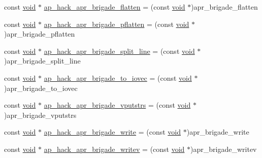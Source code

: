 \begin{DoxyCompactItemize}
\item 
const \hyperlink{group__MOD__ISAPI_gacd6cdbf73df3d9eed42fa493d9b621a6}{void} $\ast$ \hyperlink{srclib_2apr-util_2exports_8c_a2eaa178569772a75cf74731400d923e2}{ap\+\_\+hack\+\_\+apr\+\_\+brigade\+\_\+flatten} = (const \hyperlink{group__MOD__ISAPI_gacd6cdbf73df3d9eed42fa493d9b621a6}{void} $\ast$)apr\+\_\+brigade\+\_\+flatten
\item 
const \hyperlink{group__MOD__ISAPI_gacd6cdbf73df3d9eed42fa493d9b621a6}{void} $\ast$ \hyperlink{srclib_2apr-util_2exports_8c_a321cdc810a9ef25e33c780c78d5c69af}{ap\+\_\+hack\+\_\+apr\+\_\+brigade\+\_\+pflatten} = (const \hyperlink{group__MOD__ISAPI_gacd6cdbf73df3d9eed42fa493d9b621a6}{void} $\ast$)apr\+\_\+brigade\+\_\+pflatten
\item 
const \hyperlink{group__MOD__ISAPI_gacd6cdbf73df3d9eed42fa493d9b621a6}{void} $\ast$ \hyperlink{srclib_2apr-util_2exports_8c_aa39ddeace2f4d1eb0b699d29a896a1be}{ap\+\_\+hack\+\_\+apr\+\_\+brigade\+\_\+split\+\_\+line} = (const \hyperlink{group__MOD__ISAPI_gacd6cdbf73df3d9eed42fa493d9b621a6}{void} $\ast$)apr\+\_\+brigade\+\_\+split\+\_\+line
\item 
const \hyperlink{group__MOD__ISAPI_gacd6cdbf73df3d9eed42fa493d9b621a6}{void} $\ast$ \hyperlink{srclib_2apr-util_2exports_8c_a101af3f6b346b48b428a016cab91ce00}{ap\+\_\+hack\+\_\+apr\+\_\+brigade\+\_\+to\+\_\+iovec} = (const \hyperlink{group__MOD__ISAPI_gacd6cdbf73df3d9eed42fa493d9b621a6}{void} $\ast$)apr\+\_\+brigade\+\_\+to\+\_\+iovec
\item 
const \hyperlink{group__MOD__ISAPI_gacd6cdbf73df3d9eed42fa493d9b621a6}{void} $\ast$ \hyperlink{srclib_2apr-util_2exports_8c_ac4d5c0d8a47fa5c0c36b43c1a3de9f5b}{ap\+\_\+hack\+\_\+apr\+\_\+brigade\+\_\+vputstrs} = (const \hyperlink{group__MOD__ISAPI_gacd6cdbf73df3d9eed42fa493d9b621a6}{void} $\ast$)apr\+\_\+brigade\+\_\+vputstrs
\item 
const \hyperlink{group__MOD__ISAPI_gacd6cdbf73df3d9eed42fa493d9b621a6}{void} $\ast$ \hyperlink{srclib_2apr-util_2exports_8c_a78a679405d46fad62d584d2437cf8986}{ap\+\_\+hack\+\_\+apr\+\_\+brigade\+\_\+write} = (const \hyperlink{group__MOD__ISAPI_gacd6cdbf73df3d9eed42fa493d9b621a6}{void} $\ast$)apr\+\_\+brigade\+\_\+write
\item 
const \hyperlink{group__MOD__ISAPI_gacd6cdbf73df3d9eed42fa493d9b621a6}{void} $\ast$ \hyperlink{srclib_2apr-util_2exports_8c_af48805f4a685ed3d1533f645bc3996d0}{ap\+\_\+hack\+\_\+apr\+\_\+brigade\+\_\+writev} = (const \hyperlink{group__MOD__ISAPI_gacd6cdbf73df3d9eed42fa493d9b621a6}{void} $\ast$)apr\+\_\+brigade\+\_\+writev

\end{DoxyCompactItemize}
